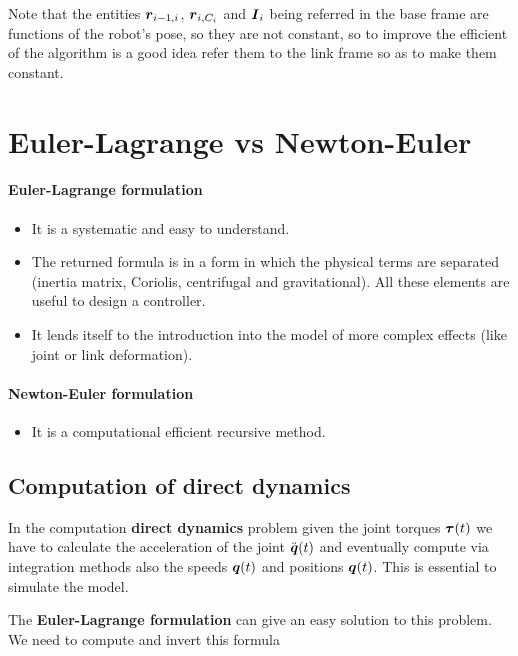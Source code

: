 Note that the entities $\boldsymbol{r}_{i-1,i}$, $\boldsymbol{r}_{i,C_i}$ and $\boldsymbol{I}_i$ being referred in the base frame are functions of the robot's pose, so they are not constant, so to improve the efficient of the algorithm is a good idea refer them to the link frame so as to make them constant.


\section{Euler-Lagrange vs Newton-Euler}

\paragraph{Euler-Lagrange formulation}

\begin{itemize}
	\item It is a systematic and easy to understand.
	\item The returned formula is in a form in which the physical terms are separated (inertia matrix, Coriolis, centrifugal and gravitational).
	All these elements are useful to design a controller.
	\item It lends itself to the introduction into the model of more complex effects (like joint or link deformation).
\end{itemize}

\paragraph{Newton-Euler formulation}

\begin{itemize}
	\item It is a computational efficient recursive method.
\end{itemize}

\subsection{Computation of direct dynamics}

In the computation \textbf{direct dynamics} problem given the joint torques $\boldsymbol{\tau}(t)$ we have to calculate the acceleration of the joint $\ddot{\boldsymbol{q}}(t)$ and eventually compute via integration methods also the speeds $\boldsymbol{q}(t)$ and positions $\boldsymbol{q}(t)$.
This is essential to simulate the model.

The \textbf{Euler-Lagrange formulation} can give an easy solution to this problem.
We need to compute and invert this formula

